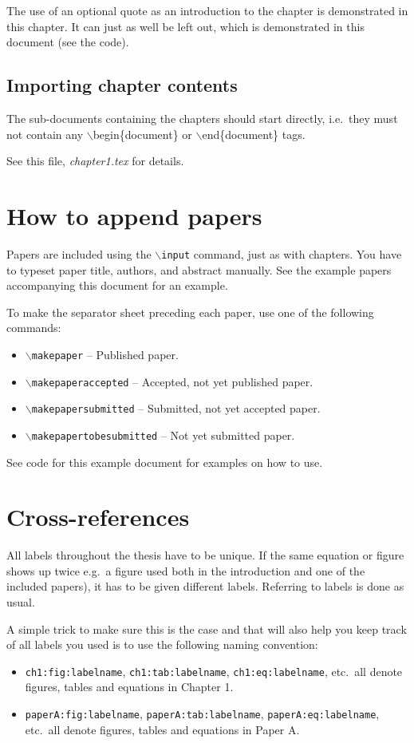The use of an optional quote as an introduction to the chapter is demonstrated in this chapter. It can just as well be left out, which is demonstrated in this document (see the code).

\subsection{Importing chapter contents}
The sub-documents containing the chapters should start directly, i.e.\ they must not contain any $\backslash$begin\{document\} or $\backslash$end\{document\} tags.

See this file, \textit{chapter1.tex} for details.

\section{How to append papers}
Papers are included using the \texttt{$\backslash$input} command, just as with chapters. You have to typeset paper title, authors, and abstract manually. See the example papers accompanying this document for an example.

To make the separator sheet preceding each paper, use one of the following commands:
\begin{itemize}
	\item \texttt{$\backslash$makepaper} -- Published paper.
	\item \texttt{$\backslash$makepaperaccepted} -- Accepted, not yet published paper.
	\item \texttt{$\backslash$makepapersubmitted} -- Submitted, not yet accepted paper.
	\item \texttt{$\backslash$makepapertobesubmitted} -- Not yet submitted paper.
\end{itemize}

See code for this example document for examples on how to use.

\section{Cross-references}
All labels throughout the thesis have to be unique. If the same
equation or figure shows up twice e.g.\ a figure used
both in the introduction and one of the included papers), it has
to be given different labels. Referring to labels is done as
usual.

A simple trick to make sure this is the case and that will also help you keep track of all labels you used is to use the following naming convention:
\begin{itemize}
	\item \texttt{ch1:fig:labelname}, \texttt{ch1:tab:labelname}, \texttt{ch1:eq:labelname}, etc.\ all denote figures, tables and equations in Chapter 1.
	\item \texttt{paperA:fig:labelname}, \texttt{paperA:tab:labelname}, \texttt{paperA:eq:labelname}, etc.\ all denote figures, tables and equations in Paper A.
\end{itemize}

